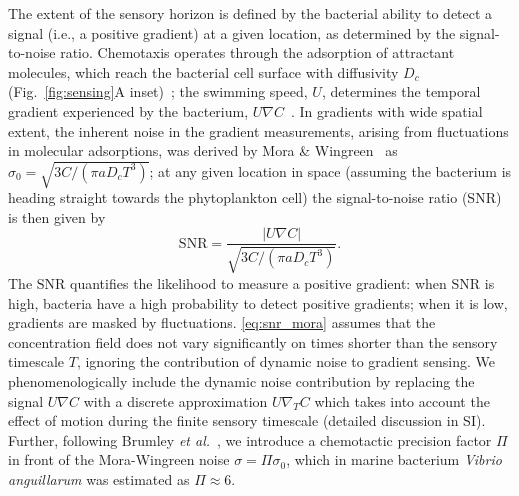 \documentclass[9pt,twocolumn,twoside]{pnas-new}
\newcommand{\SNR}{\mathrm{SNR}}
\begin{document}
The extent of the sensory horizon is defined by the bacterial ability to detect a signal (i.e., a positive gradient) at a given location, as determined by the signal-to-noise ratio.
Chemotaxis operates through the adsorption of attractant molecules, which reach the bacterial cell surface with diffusivity $D_c$ (Fig.~\ref{fig:sensing}A inset)~\cite{berg1977physics}; the swimming speed, $U$, determines the temporal gradient experienced by the bacterium, $U\nabla C$~\cite{berg1977physics,hein2016physical}.
In gradients with wide spatial extent, the inherent noise in the gradient measurements, arising from fluctuations in molecular adsorptions, was derived by Mora \& Wingreen~\cite{mora2010limits} as $\sigma_0 = \sqrt{3C/(\pi a D_c T^3)}$; at any given location in space (assuming the bacterium is heading straight towards the phytoplankton cell) the signal-to-noise ratio ($\SNR$) is then given by
\begin{equation}\label{eq:snr_mora}
    \SNR = \dfrac{|U\nabla C|}{\sqrt{3C/(\pi a D_c T^3)}}.
\end{equation}
The $\SNR$ quantifies the likelihood to measure a positive gradient: 
when $\SNR$ is high, bacteria have a high probability to detect positive gradients; when it is low, gradients are masked by fluctuations.
\eqref{eq:snr_mora} assumes that the concentration field does not vary significantly on times shorter than the sensory timescale $T$, ignoring the contribution of dynamic noise to gradient sensing. We phenomenologically include the dynamic noise contribution by replacing the signal $U\nabla C$ with a discrete approximation $U\nabla_T C$ which takes into account the effect of motion during the finite sensory timescale (detailed discussion in SI).
Further, following Brumley \textit{et al.}~\cite{brumley2019bacteria}, we introduce a chemotactic precision factor $\Pi$ in front of the Mora-Wingreen noise $\sigma = \Pi\sigma_0$, which in marine bacterium \textit{Vibrio anguillarum} was estimated as $\Pi\approx6$.
\end{document}
